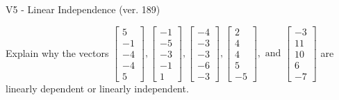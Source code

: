 \begin{exercise}
  \begin{exerciseTitle}V5 - Linear Independence (ver. 189)\end{exerciseTitle}
  \begin{exerciseStatement}
    Explain why the vectors \(\left[\begin{array}{r}
5 \\
-1 \\
-4 \\
-4 \\
5
\end{array}\right] , \left[\begin{array}{r}
-1 \\
-5 \\
-3 \\
-1 \\
1
\end{array}\right] , \left[\begin{array}{r}
-4 \\
-3 \\
-3 \\
-6 \\
-3
\end{array}\right] , \left[\begin{array}{r}
2 \\
4 \\
4 \\
5 \\
-5
\end{array}\right] , \text{ and } \left[\begin{array}{r}
-3 \\
11 \\
10 \\
6 \\
-7
\end{array}\right]\) are linearly dependent or linearly independent.	



\end{exerciseStatement}
\end{exercise}
